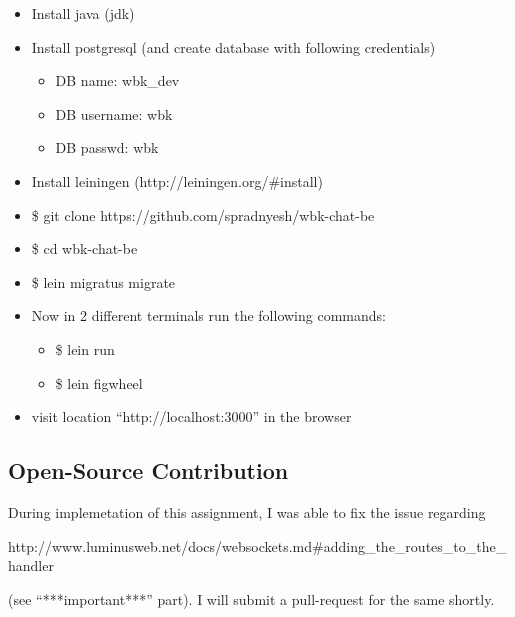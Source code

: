 \documentclass[a4paper, 10pt]{article}
\begin{document}
\begin{itemize}
  \item Install java (jdk)
  \item Install postgresql (and create database with following credentials)
    \begin{itemize}
    \item DB name: wbk\_dev
    \item DB username: wbk
    \item DB passwd: wbk
    \end{itemize}
  \item Install leiningen (http://leiningen.org/\#install)
  \item \$ git clone https://github.com/spradnyesh/wbk-chat-be
  \item \$ cd wbk-chat-be
  \item \$ lein migratus migrate
  \item Now in 2 different terminals run the following commands:
    \begin{itemize}
    \item \$ lein run
    \item \$ lein figwheel
    \end{itemize}
  \item visit location ``http://localhost:3000'' in the browser
\end{itemize}

\subsection{Open-Source Contribution}
During implemetation of this assignment, I was able to fix the issue regarding

http://www.luminusweb.net/docs/websockets.md\#adding\_the\_routes\_to\_the\_handler

(see ``***important***'' part). I will submit a pull-request for the same shortly.

\end{document}

